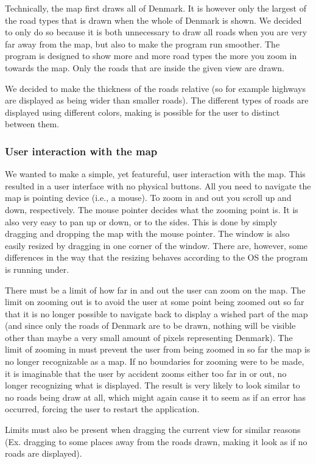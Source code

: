 \documentclass[a4paper,11pt]{article}
\begin{document}
Technically, the map first draws all of Denmark. It is however only the largest of the road types that is drawn when the whole of Denmark is shown. We decided to only do so because it is both unnecessary to draw all roads when you are very far away from the map, but also to make the program run smoother. The program is designed to show more and more road types the more you zoom in towards the map. Only the roads that are inside the given view are drawn.

We decided to make the thickness of the roads relative (so for example highways are displayed as being wider than smaller roads). The different types of roads are displayed using different colors, making is possible for the user to distinct between them.

\subsubsection{User interaction with the map}
We wanted to make a simple, yet featureful, user interaction with the map. This resulted in a user interface with no physical buttons. All you need to navigate the map is pointing device (i.e., a mouse). To zoom in and out you scroll up and down, respectively. The mouse pointer decides what the zooming point is. It is also very easy to pan up or down, or to the sides. This is done by simply dragging and dropping the map with the mouse pointer. The window is also easily resized by dragging in one corner of the window. There are, however, some differences in the way that the resizing behaves according to the OS the program is running under.

There must be a limit of how far in and out the user can zoom on the map. The limit on zooming out is to avoid the user at some point being zoomed out so far that it is no longer possible to navigate back to display a wished part of the map (and since only the roads of Denmark are to be drawn, nothing will be visible other than maybe a very small amount of pixels representing Denmark). The limit of zooming in must prevent the user from being zoomed in so far the map is no longer recognizable as a map. If no boundaries for zooming were to be made, it is imaginable that the user by accident zooms either too far in or out, no longer recognizing what is displayed. The result is very likely to look similar to no roads being draw at all, which might again cause it to seem as if an error has occurred, forcing the user to restart the application.

Limits must also be present when dragging the current view for similar reasons (Ex. dragging to some places away from the roads drawn, making it look as if no roads are displayed).
\end{document}
